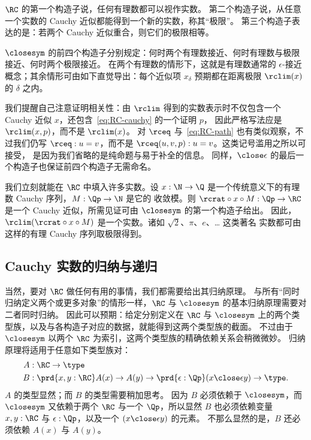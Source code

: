 \mentalpause

$\RC$ 的第一个构造子说，任何有理数都可以视作实数。
第二个构造子说，从任意一个实数的 Cauchy 近似都能得到一个新的实数，称其“极限”。
第三个构造子表达的是：若两个 Cauchy 近似重合，则它们的极限相等。

$\closesym$ 的前四个构造子分别规定：何时两个有理数接近、何时有理数与极限接近、何时两个极限接近。
在两个有理数的情形下，这就是有理数通常的 $\epsilon$-接近概念；其余情形可由如下直觉导出：每个近似项 $x_\delta$ 预期都在距离极限 $\rclim(x)$ 的 $\delta$ 之内。

我们提醒自己注意证明相关性：由 $\rclim$ 得到的实数表示时不仅包含一个 Cauchy 近似 $x$，还包含~\eqref{eq:RC-cauchy} 的一个证明 $p$，
因此严格写法应是 $\rclim(x,p)$，而不是 $\rclim(x)$。
对 $\rceq$ 与~\eqref{eq:RC-path} 也有类似观察，不过我们仍写
$\rceq : u = v$，而不是 $\rceq(u, v, p) : u = v$。这类记号滥用之所以可接受，
是因为我们省略的是纯命题与易于补全的信息。
同样，$\mathord{\close\epsilon}$ 的最后一个构造子也保证前四个构造子无需命名。

我们立刻就能在 $\RC$ 中填入许多实数。设 $x : \N \to
\Q$ 是一个传统意义下的有理数 Cauchy 序列，$M : \Qp \to \N$ 是它的
收敛模。则 $\rcrat \circ x \circ M : \Qp \to \RC$ 是一个 Cauchy
近似，所需见证可由 $\closesym$ 的第一个构造子给出。
因此，$\rclim(\rcrat \circ x \circ M)$ 是一个实数。诸如 $\sqrt{2}$、$\pi$、$e$、\dots{} 这类著名
实数都可由这样的有理 Cauchy 序列取极限得到。

\subsection{Cauchy 实数的归纳与递归}
\label{sec:induct-recurs-cauchy}

当然，要对 $\RC$ 做任何有用的事情，我们都需要给出其归纳原理。
与所有“同时归纳定义两个或更多对象”的情形一样，$\RC$ 与 $\closesym$ 的基本归纳原理需要对二者同时归纳。
因此可以预期：给定分别定义在 $\RC$ 与 $\closesym$ 上的两个类型族，以及与各构造子对应的数据，就能得到这两个类型族的截面。
不过由于 $\closesym$ 以两个 $\RC$ 为索引，这两个类型族的精确依赖关系会稍微微妙。
归纳原理将适用于任意如下类型族对：
\begin{align*}
A&:\RC\to\type\\
B&:\prd{x,y:\RC} A(x) \to A(y) \to \prd{\epsilon:\Qp} (x\close\epsilon y) \to \type.
\end{align*}
$A$ 的类型显然；而 $B$ 的类型需要稍加思考。
因为 $B$ 必须依赖于 $\closesym$，而 $\closesym$ 又依赖于两个 $\RC$ 与一个 $\Qp$，所以显然 $B$ 也必须依赖变量 $x,y:\RC$ 与 $\epsilon:\Qp$，以及一个 $(x\close\epsilon y)$ 的元素。
不那么显然的是，$B$ 还必须依赖 $A(x)$ 与 $A(y)$。

